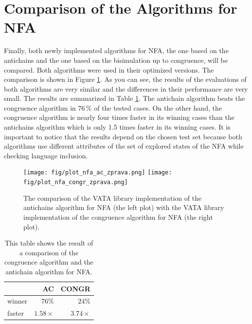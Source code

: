 \section{Comparison of the Algorithms for NFA}
Finally, both newly implemented algorithms for NFA, the one based on the antichains and the one based on the bisimulation up to congruence, will be compared.
Both algorithms were used in their optimized versions.
The comparison is shown in Figure \ref{fig:figPlotNFA}.
As you can see, the results of the evaluations of both algorithms are very similar and the differences in their performance are very small. 
The results are summarized in Table \ref{tabNFA}. The antichain algorithm beats the congruence algorithm in 76\,\% of
the tested cases. On the other hand, the congruence algorithm is nearly four times faster in its winning cases than the antichains algorithm which is
only 1.5 times faster in its winning cases. 
It is important to notice that the results depend on the chosen test set because both algorithms use different attributes
of the set of explored states of the NFA while checking language inclusion.

\begin{figure}[h]
\begin{center}
\texttt{[image: fig/plot\_nfa\_ac\_zprava.png]}
\texttt{[image: fig/plot\_nfa\_congr\_zprava.png]}
\caption{The comparison of the VATA library implementation of the antichains algorithm for NFA (the left plot)
    with the VATA library implementation of the congruence algorithm for NFA (the right plot).}
\label{fig:figPlotNFA}
\end{center}
\end{figure}

\begin{table}[h]
\begin{center}
\parbox{.45\linewidth}{
  \begin{tabular}[scale=0.3]{ | l | r | r |}
   \hline
    & \textbf{AC} & \textbf{CONGR} \\ \hline \hline
    winner & $76\%$ & $24\%$ \\ \hline
    faster & $1.58\times$ & $3.74\times$ \\ \hline
   \end{tabular}
}
   \caption{This table shows the result of a comparison of the congruence algorithm and the antichain algorithm for NFA.}
   \label{tabNFA}
\end{center}
\end{table}

